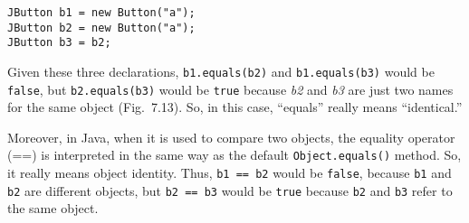 \begin{jjjlisting}
\begin{lstlisting}
JButton b1 = new Button("a");
JButton b2 = new Button("a");
JButton b3 = b2;
\end{lstlisting}
\end{jjjlisting}

\noindent Given these three declarations, {\tt b1.equals(b2)}
and {\tt b1.equals(b3)} would be {\tt false}, but {\tt b2.equals(b3)}
would be {\tt true} because {\it b2} and {\it b3} are just two
names for the same object (Fig.~7.13). So, in this case,
``equals'' really means ``identical.''

Moreover, in Java, when it is used to compare two objects, the equality operator
(==) is interpreted in the same way as the default {\tt Object.equals()}
method.   So, it really means object identity.   Thus, {\tt b1 == b2} 
would be {\tt false}, because {\tt b1} and {\tt b2}
are different objects, but {\tt b2 == b3} would be {\tt true} because
{\tt b2} and {\tt b3} refer to the same object.


